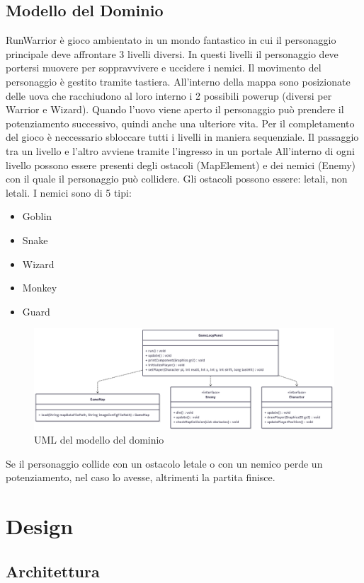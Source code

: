 \documentclass[a4paper,12pt]{report}
\begin{document}
\section{Modello del Dominio}
RunWarrior è gioco ambientato in un mondo fantastico in cui il personaggio principale deve affrontare 3 livelli diversi. In questi
livelli il personaggio deve portersi muovere per soppravvivere e uccidere i nemici. Il movimento del personaggio è gestito tramite tastiera.
All'interno della mappa sono posizionate delle uova che racchiudono al loro interno i 2 possibili powerup (diversi per Warrior e Wizard).
Quando l'uovo viene aperto il personaggio può prendere il potenziamento successivo, quindi anche una ulteriore vita.
Per il completamento del gioco è neccessario sbloccare tutti i livelli in maniera sequenziale.
Il passaggio tra un livello e l'altro avviene tramite l'ingresso in un portale 
All'interno di ogni livello possono essere presenti degli ostacoli (MapElement) e dei nemici (Enemy) con il quale il personaggio può collidere.
Gli ostacoli possono essere: letali, non letali. I nemici sono di 5 tipi:
\begin{itemize}
    \item Goblin
    \item Snake
    \item Wizard
    \item Monkey 
    \item Guard
\end{itemize}

\begin{figure}
    \centering
    \includegraphics[width=\textwidth]{resources/modelloDominioUML.png}
    \caption{UML del modello del dominio}
    \label{}
\end{figure}

Se il personaggio collide con un ostacolo letale o con un nemico perde un potenziamento, nel caso lo avesse, altrimenti la partita finisce.
\chapter{Design}
\section{Architettura}
\end{document}
